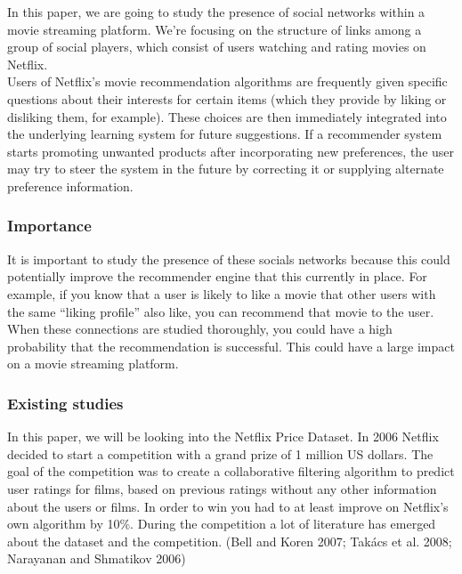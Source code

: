 \documentclass[
  man]{apa6}
\begin{document}
In this paper, we are going to study the presence of social networks
within a movie streaming platform. We're focusing on the structure of
links among a group of social players, which consist of users watching
and rating movies on Netflix.\\
Users of Netflix's movie recommendation algorithms are frequently given
specific questions about their interests for certain items (which they
provide by liking or disliking them, for example). These choices are
then immediately integrated into the underlying learning system for
future suggestions. If a recommender system starts promoting unwanted
products after incorporating new preferences, the user may try to steer
the system in the future by correcting it or supplying alternate
preference information.

\hypertarget{importance}{%
\subsubsection{Importance}\label{importance}}

It is important to study the presence of these socials networks because
this could potentially improve the recommender engine that this
currently in place. For example, if you know that a user is likely to
like a movie that other users with the same ``liking profile'' also
like, you can recommend that movie to the user. When these connections
are studied thoroughly, you could have a high probability that the
recommendation is successful. This could have a large impact on a movie
streaming platform.

\hypertarget{existing-studies}{%
\subsubsection{Existing studies}\label{existing-studies}}

In this paper, we will be looking into the Netflix Price Dataset. In
2006 Netflix decided to start a competition with a grand prize of 1
million US dollars. The goal of the competition was to create a
collaborative filtering algorithm to predict user ratings for films,
based on previous ratings without any other information about the users
or films. In order to win you had to at least improve on Netflix's own
algorithm by 10\%. During the competition a lot of literature has
emerged about the dataset and the competition. (Bell and Koren 2007;
Takács et al. 2008; Narayanan and Shmatikov 2006)
\end{document}
